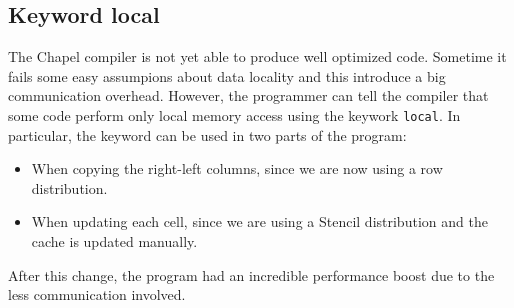 \documentclass{article}
\begin{document}
\subsection{Keyword local}
The Chapel compiler is not yet able to produce well optimized code. Sometime it fails some easy assumpions about data locality and this introduce a big communication overhead. However, the programmer can tell the compiler that some code perform only local memory access using the keywork \texttt{local}. In particular, the keyword can be used in two parts of the program:
\begin{itemize}
    \item When copying the right-left columns, since we are now using a row distribution.
    \item When updating each cell, since we are using a Stencil distribution and the cache is updated manually.
\end{itemize}
After this change, the program had an incredible performance boost due to the less communication involved.
\end{document}
